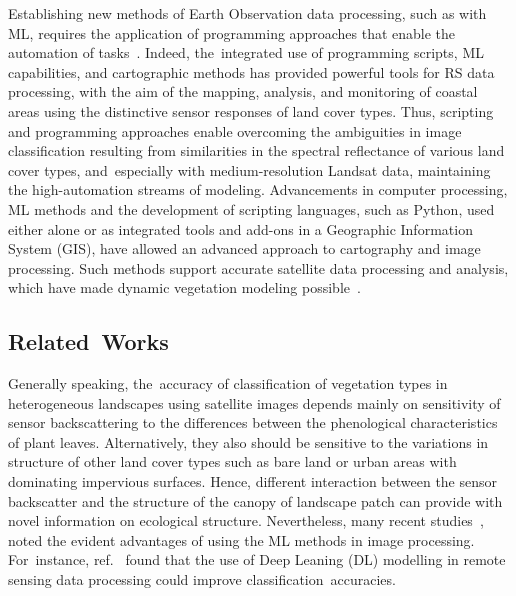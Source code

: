 \documentclass[coasts,article,accept,pdftex,oneauthor]{Definitions/mdpi}
\begin{document}
Establishing new methods of Earth Observation data processing, such as with ML, requires the application of programming approaches that enable the  automation of tasks~\cite{MULLISSA2023113799,Lemenkova202206}. Indeed, the~integrated use of  programming scripts, ML capabilities, and cartographic methods has provided powerful tools for RS data processing, with the aim of the mapping, analysis, and monitoring of coastal areas using the distinctive sensor responses of land cover types. {Thus, scripting and programming approaches enable overcoming the ambiguities in image classification resulting from similarities in the spectral reflectance of various land cover types, and~especially with medium-resolution Landsat data, maintaining the high-automation streams of modeling.} Advancements in computer processing, ML methods and the development of scripting languages, such as Python, used either alone or {as }integrated {tools and add-ons }in a Geographic Information System (GIS), have allowed an advanced {approach to} cartography and image processing. Such methods support accurate satellite data processing and analysis, which have {made} dynamic vegetation modeling possible~\cite{Lemenkova202227}. 

\subsection{Related~Works}
Generally speaking, the~accuracy of classification of vegetation types in heterogeneous landscapes using satellite images depends mainly on sensitivity of sensor backscattering to the {differences} between the phenological characteristics of plant leaves{. Alternatively, they also should be sensitive to the variations in} structure of other land cover types{ }such as bare land or urban areas with dominating impervious surfaces{. Hence, }different interaction between the sensor backscatter and the structure of the canopy of landscape patch {can provide with novel information on ecological structure}. Nevertheless, many recent studies~\cite{rs15235559,WU2023103407,CHEN2023101499,rs15225387,LIN2021102370}, noted the evident advantages of using the {ML} methods in image processing. For~instance, ref.~\cite{LIAO2023110231} found that the use of Deep Leaning (DL) modelling in remote sensing data processing could improve classification~accuracies. 
\end{document}
